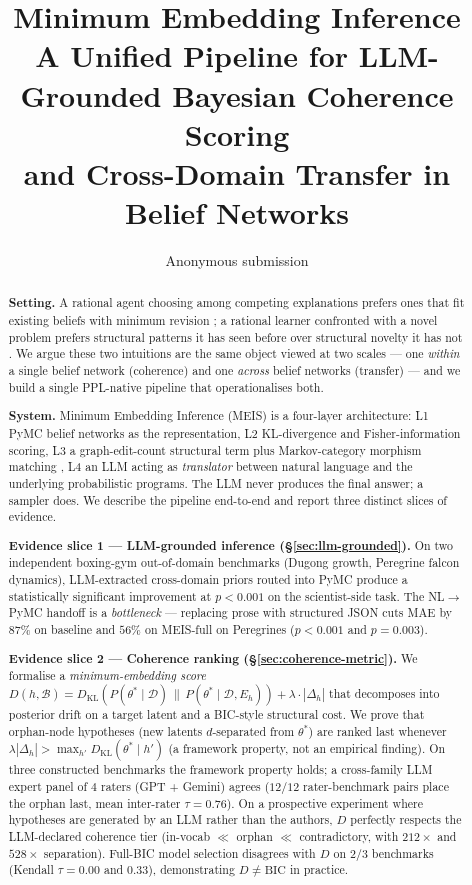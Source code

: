 \documentclass{article}
\title{\textbf{Minimum Embedding Inference}\\
A Unified Pipeline for LLM-Grounded Bayesian Coherence Scoring\\
and Cross-Domain Transfer in Belief Networks}
\author{Anonymous submission}
\date{}
\begin{document}
\maketitle

\begin{abstract}
\noindent
\textbf{Setting.} A rational agent choosing among competing explanations prefers
ones that fit existing beliefs with minimum revision \citep{quine1951twodogmas,
lakatos1970}; a rational learner confronted with a novel problem prefers
structural patterns it has seen before over structural novelty it has not
\citep{lakatos1970, finn2017maml}. We argue these two intuitions are the
same object viewed at two scales --- one \emph{within} a single belief
network (coherence) and one \emph{across} belief networks (transfer) ---
and we build a single PPL-native pipeline that operationalises both.

\textbf{System.} Minimum Embedding Inference (MEIS) is a four-layer
architecture: L1 PyMC belief networks \citep{salvatier2016pymc} as the
representation, L2 KL-divergence and Fisher-information scoring, L3 a
graph-edit-count structural term plus Markov-category morphism matching
\citep{fritz2020synthetic, perrone2024catinfogeom}, L4 an LLM acting as
\emph{translator} between natural language and the underlying
probabilistic programs. The LLM never produces the final answer; a
sampler does. We describe the pipeline end-to-end and report three
distinct slices of evidence.

\textbf{Evidence slice 1 --- LLM-grounded inference
(\S\ref{sec:llm-grounded}).} On two independent boxing-gym
\citep{li2025boxinggym} out-of-domain benchmarks (Dugong growth,
Peregrine falcon dynamics), LLM-extracted cross-domain priors routed
into PyMC produce a statistically significant improvement at
$p < 0.001$ on the scientist-side task. The
NL$\to$PyMC handoff is a \emph{bottleneck} --- replacing prose with
structured JSON cuts MAE by $87\%$ on baseline and $56\%$ on MEIS-full
on Peregrines ($p < 0.001$ and $p = 0.003$).

\textbf{Evidence slice 2 --- Coherence ranking
(\S\ref{sec:coherence-metric}).} We formalise a
\emph{minimum-embedding score}
$D(h, \mathcal{B}) = D_{\mathrm{KL}}(P(\theta^{*} \mid \mathcal{D}) \,\|\,
P(\theta^{*} \mid \mathcal{D}, E_{h})) + \lambda \cdot |\Delta_{h}|$ that
decomposes into posterior drift on a target latent and a BIC-style
structural cost. We prove that orphan-node hypotheses (new latents
$d$-separated from $\theta^{*}$) are ranked last whenever
$\lambda |\Delta_{h}| > \max_{h'} D_{\mathrm{KL}}(\theta^{*} \mid h')$
(a framework property, not an empirical finding). On three
constructed benchmarks the framework property holds; a
cross-family LLM expert panel of $4$ raters (GPT + Gemini) agrees
($12/12$ rater-benchmark pairs place the orphan last, mean inter-rater
$\tau = 0.76$). On a prospective experiment where hypotheses are
generated by an LLM rather than the authors, $D$ perfectly
respects the LLM-declared coherence tier (in-vocab $\ll$ orphan $\ll$
contradictory, with $212\times$ and $528\times$ separation).
Full-BIC model selection disagrees with $D$ on $2/3$ benchmarks
(Kendall $\tau = 0.00$ and $0.33$), demonstrating $D \ne \text{BIC}$
in practice.


\end{abstract}
\end{document}
